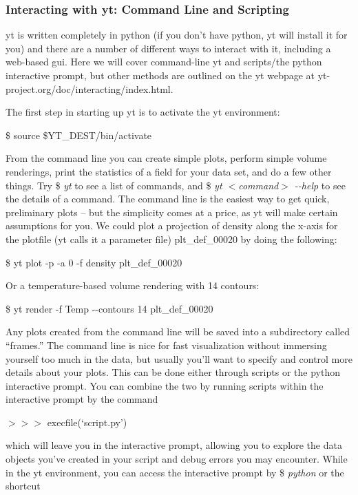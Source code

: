 \subsubsection{Interacting with yt: Command Line and Scripting}

yt is written completely in python (if you don't have python, yt will
install it for you) and there are a number of different ways to
interact with it, including a web-based gui. Here we will cover
command-line yt and scripts/the python interactive prompt, but other
methods are outlined on the yt webpage at
yt-project.org/doc/interacting/index.html.

The first step in starting up yt is to activate the yt environment:

\$ source \$YT\_DEST/bin/activate

From the command line you can create simple plots, perform simple
volume renderings, print the statistics of a field for your data set,
and do a few other things. Try {\$ \it yt} to see a list of commands,
and {\$ \it yt {\footnotesize$<$}command{\footnotesize$>$} -{}-help}
to see the details of a command. The command line is the easiest way
to get quick, preliminary plots -- but the simplicity comes at a
price, as yt will make certain assumptions for you. We could plot a
projection of density along the x-axis for the plotfile (yt calls it a
parameter file) plt\_def\_00020 by doing the following:

\$ yt plot -p -a 0 -f density plt\_def\_00020

Or a temperature-based volume rendering with 14 contours:

\$ yt render -f Temp -{}-contours 14 plt\_def\_00020

Any plots created from the command line will be saved into a
subdirectory called ``frames.'' The command line is nice for fast
visualization without immersing yourself too much in the data, but
usually you'll want to specify and control more details about your
plots. This can be done either through scripts or the python
interactive prompt. You can combine the two by running scripts within
the interactive prompt by the command

{\scriptsize$>>>$} execfile(`script.py')

which will leave you in the interactive prompt, allowing you to
explore the data objects you've created in your script and debug
errors you may encounter. While in the yt environment, you can access
the interactive prompt by {\$ \it python} or the shortcut

